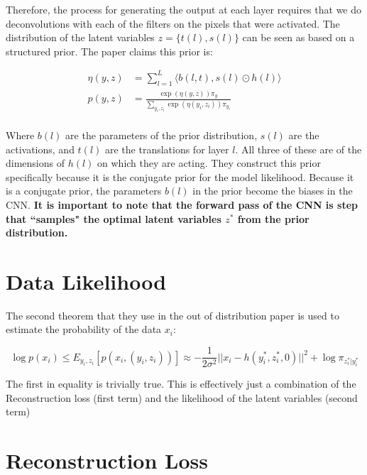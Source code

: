 \documentclass{report}
\begin{document}
	Therefore, the process for generating the output at each layer requires that we do deconvolutions with each of the filters on the pixels that were activated. The distribution of the latent variables $z = \{t(l), s(l)\}$ can be seen as based on a structured prior. The paper claims this prior is:
	
	\begin{equation}
		\begin{split}
		\eta(y, z) &= \sum_{l=1}^{L} \langle b(l, t), s(l) \odot h(l) \rangle \\
	 	p(y, z) &= \frac{\exp \left(\eta(y, z)\right)\pi_y}
	 	{\sum_{y_i, z_i}\exp\left(\eta(y_i, z_i)\right)\pi_{y_i}} \\
	 	\end{split}
	\end{equation}

	Where $b(l)$ are the parameters of the prior distribution, $s(l)$ are the activations, and $t(l)$ are the translations for layer $l$. All three of these are of the dimensions of $h(l)$ on which they are acting. They construct this prior specifically because it is the conjugate prior for the model likelihood. Because it is a conjugate prior, the parameters $b(l)$ in the prior become the biases in the CNN. \textbf{It is important to note that the forward pass of the CNN is step that ``samples" the optimal latent variables $z^*$ from the prior distribution.}
	
	\section{Data Likelihood}
	The second theorem that they use in the out of distribution paper is used to estimate the probability of the data $x_i$:
	
	\begin{equation}
	\log p (x_i) \leq E_{y_i, z_i}\left[p\left(x_i, (y_i, z_i)\right)\right] \approx -\frac{1}{2\sigma^2}||x_i - h(y_i^*, z_i^*, 0)||^2 + \log \pi_{z_i^*|y_i^*}
	\end{equation}
	
	The first in equality is trivially true. This is effectively just a combination of the Reconstruction loss (first term) and the likelihood of the latent variables (second term)
	
	\section{Reconstruction Loss}
	
\end{document}
